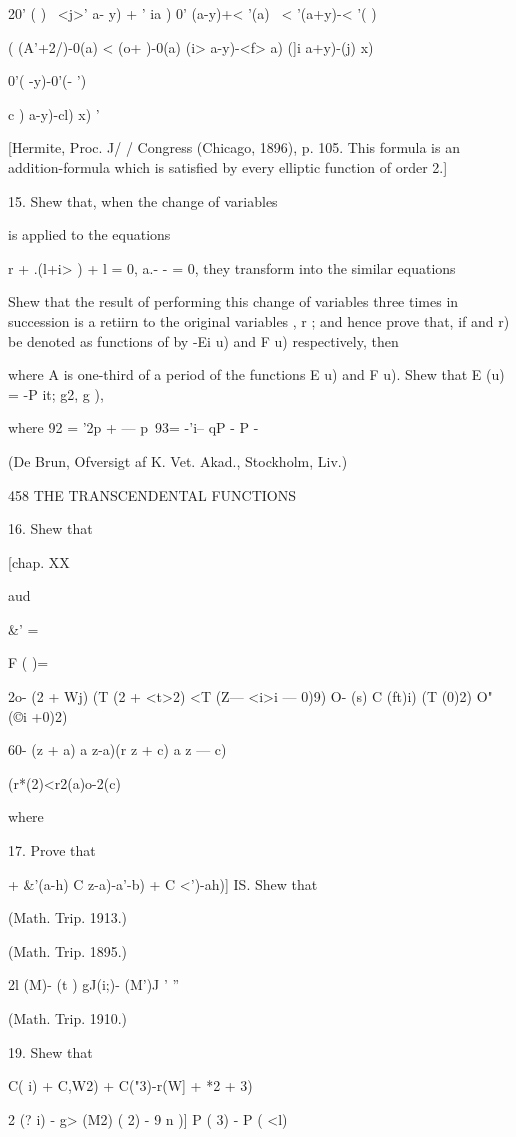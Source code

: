 {20' ( ) \ <j>' a- y) + ' ia ) 0' (a-y)+< '(a) \ < '(a+y)-< '( )

( (A'+2/)-0(a) < (o+ )-0(a) (i> a-y)-<f> a) (]i a+y)-(j) x)

0'( -y)-0'(- ')

c ) a-y)-cl) x) '

[Hermite, Proc. J/ / Congress (Chicago, 1896), p. 105. This formula is
an addition-formula which is satisfied by every elliptic function of
order 2.]

15. Shew that, when the change of variables

is applied to the equations

r + .(l+i> ) + l = 0, a.- - = 0, they transform into the similar
equations

Shew that the result of performing this change of variables three
times in succession is a retiirn to the original variables , r ; and
hence prove that, if and r) be denoted as functions of by -Ei u) and F
u) respectively, then

where A is one-third of a period of the functions E u) and F u). Shew
that E (u) = -P it; g2, g ),

where 92 = '2p + — p\ 93= -'i-- qP - P -

(De Brun, Ofversigt af K. Vet. Akad., Stockholm, Liv.)

458 THE TRANSCENDENTAL FUNCTIONS

16. Shew that

[chap. XX

aud

\&' =

F ( )=

2o- (2 + Wj) (T (2 + <t>2) <T (Z— <i>i — 0)9) O- (s) C (ft)i) (T (0)2)
O" (©i +0)2)

60- (z + a) a z-a)(r z + c) a z — c)

(r*(2)<r2(a)o-2(c)

where

17. Prove that

+ \&'(a-h) C z-a)-a'-b) + C <')-ah)] IS. Shew that

(Math. Trip. 1913.)

(Math. Trip. 1895.)

2l (M)- (t ) gJ(i;)- (M')J ' ''

(Math. Trip. 1910.)

19. Shew that

C( i) + C,W2) + C("3)-r(W] + *2 + 3)

2 (? i) - g> (M2) ( 2) - 9 n )] P ( 3) - P ( <l)

}
